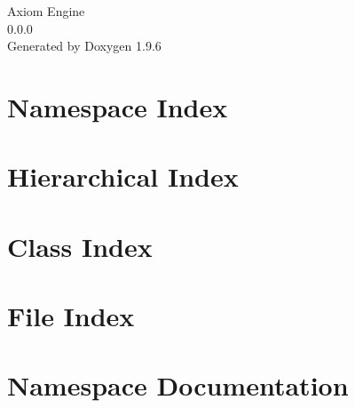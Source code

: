\documentclass[twoside]{book}
\newcommand{\+}{\discretionary{\mbox{\scriptsize$\hookleftarrow$}}{}{}}
\newcommand{\clearemptydoublepage}{%
    \newpage{\pagestyle{empty}\cleardoublepage}%
  }
\begin{document}
  \raggedbottom
    \hypersetup{pageanchor=false,
                bookmarksnumbered=true,
                pdfencoding=unicode
               }
  \begin{titlepage}
  \vspace*{7cm}
  \begin{center}%
  {\Large Axiom Engine}\\
  [1ex]\large 0.\+0.\+0 \\
  \vspace*{1cm}
  {\large Generated by Doxygen 1.9.6}\\
  \end{center}
  \end{titlepage}
  \clearemptydoublepage
  \tableofcontents
  \clearemptydoublepage
  \hypersetup{pageanchor=true}
\chapter{Namespace Index}

\chapter{Hierarchical Index}

\chapter{Class Index}

\chapter{File Index}

\chapter{Namespace Documentation}












\end{document}
